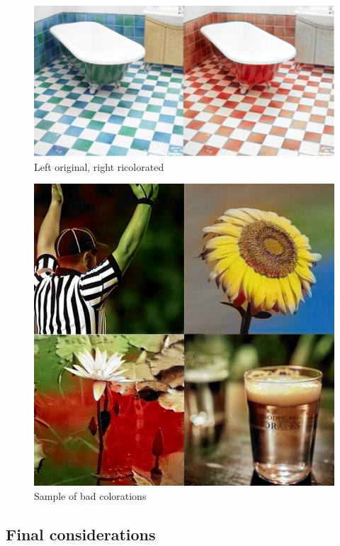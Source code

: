 \documentclass[twoside,twocolumn]{article}
\begin{document}
\begin{figure}
	\includegraphics[width=\linewidth]{img/banio.png}
	\caption{Left original, right ricolorated}
	\label{fig:banio}
\end{figure}

\begin{figure}
	\includegraphics[width=\linewidth]{img/bad.png}
	\caption{Sample of bad colorations}
	\label{fig:bad}
\end{figure}

\subsection{Final considerations}
\end{document}
